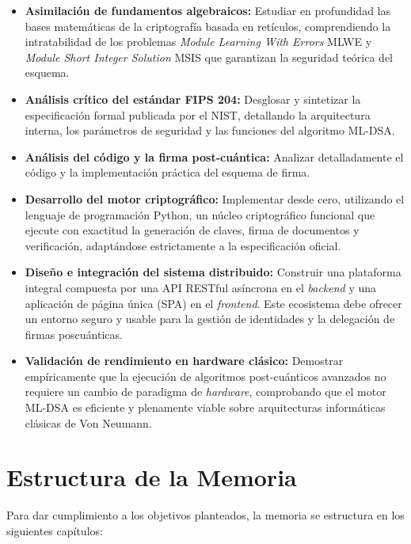 \documentclass[11pt, a4paper]{report}
\theoremstyle{definition}
\begin{document}
\begin{itemize}
    \item \textbf{Asimilación de fundamentos algebraicos:} Estudiar en profundidad las bases matemáticas de la criptografía basada en retículos, comprendiendo la intratabilidad de los problemas \textit{Module Learning With Errors} MLWE y \textit{Module Short Integer Solution} MSIS que garantizan la seguridad teórica del esquema.
    
    \item \textbf{Análisis crítico del estándar FIPS 204:} Desglosar y sintetizar la especificación formal publicada por el NIST, detallando la arquitectura interna, los parámetros de seguridad y las funciones del algoritmo ML-DSA.
    
    \item \textbf{Análisis del código y la firma post-cuántica:} Analizar detalladamente el código y la implementación práctica del esquema de firma.
    \item \textbf{Desarrollo del motor criptográfico:} Implementar desde cero, utilizando el lenguaje de programación Python, un núcleo criptográfico funcional que ejecute con exactitud la generación de claves, firma de documentos y verificación, adaptándose estrictamente a la especificación oficial.
    
    \item \textbf{Diseño e integración del sistema distribuido:} Construir una plataforma integral compuesta por una API RESTful asíncrona en el \textit{backend} y una aplicación de página única (SPA) en el \textit{frontend}. Este ecosistema debe ofrecer un entorno seguro y usable para la gestión de identidades y la delegación de firmas poscuánticas.
    
    \item \textbf{Validación de rendimiento en hardware clásico:} Demostrar empíricamente que la ejecución de algoritmos post-cuánticos avanzados no requiere un cambio de paradigma de \textit{hardware}, comprobando que el motor ML-DSA es eficiente y plenamente viable sobre arquitecturas informáticas clásicas de Von Neumann.
\end{itemize}

\section{Estructura de la Memoria}

Para dar cumplimiento a los objetivos planteados, la memoria se estructura en los siguientes capítulos:
\end{document}
